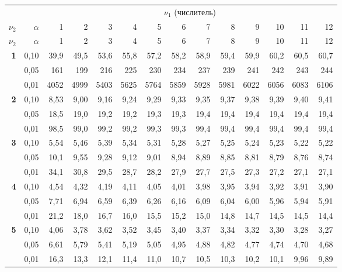 \documentclass[12pt,a4paper]{article}
\begin{document}
{\footnotesize
\setlength{\tabcolsep}{2pt}
\begin{longtable}{@{\extracolsep{\fill}}rrrrrrrrrrrrrr@{}}
\toprule
& & \multicolumn{12}{c}{$\nu_1$ (числитель)} \\
$\nu_2$ & $\alpha$ & 1 & 2 & 3 & 4 & 5 & 6 & 7 & 8 & 9 & 10 & 11 & 12 \\
\midrule
\endfirsthead
\toprule
$\nu_2$ & $\alpha$ & 1 & 2 & 3 & 4 & 5 & 6 & 7 & 8 & 9 & 10 & 11 & 12 \\
\midrule
\endhead
\bottomrule
\endfoot
\textbf{1} & 0,10 & 39,9 & 49,5 & 53,6 & 55,8 & 57,2 & 58,2 & 58,9 & 59,4 & 59,9 & 60,2 & 60,5 & 60,7 \\*
 & 0,05 & 161 & 199 & 216 & 225 & 230 & 234 & 237 & 239 & 241 & 242 & 243 & 244 \\*
 & 0,01 & 4052 & 4999 & 5403 & 5625 & 5764 & 5859 & 5928 & 5981 & 6022 & 6056 & 6083 & 6106 \\
\addlinespace[1pt]
\textbf{2} & 0,10 & 8,53 & 9,00 & 9,16 & 9,24 & 9,29 & 9,33 & 9,35 & 9,37 & 9,38 & 9,39 & 9,40 & 9,41 \\*
 & 0,05 & 18,5 & 19,0 & 19,2 & 19,2 & 19,3 & 19,3 & 19,4 & 19,4 & 19,4 & 19,4 & 19,4 & 19,4 \\*
 & 0,01 & 98,5 & 99,0 & 99,2 & 99,2 & 99,3 & 99,3 & 99,4 & 99,4 & 99,4 & 99,4 & 99,4 & 99,4 \\
\addlinespace[1pt]
\textbf{3} & 0,10 & 5,54 & 5,46 & 5,39 & 5,34 & 5,31 & 5,28 & 5,27 & 5,25 & 5,24 & 5,23 & 5,22 & 5,22 \\*
 & 0,05 & 10,1 & 9,55 & 9,28 & 9,12 & 9,01 & 8,94 & 8,89 & 8,85 & 8,81 & 8,79 & 8,76 & 8,74 \\*
 & 0,01 & 34,1 & 30,8 & 29,5 & 28,7 & 28,2 & 27,9 & 27,7 & 27,5 & 27,3 & 27,2 & 27,1 & 27,1 \\
\addlinespace[1pt]
\textbf{4} & 0,10 & 4,54 & 4,32 & 4,19 & 4,11 & 4,05 & 4,01 & 3,98 & 3,95 & 3,94 & 3,92 & 3,91 & 3,90 \\*
 & 0,05 & 7,71 & 6,94 & 6,59 & 6,39 & 6,26 & 6,16 & 6,09 & 6,04 & 6,00 & 5,96 & 5,94 & 5,91 \\*
 & 0,01 & 21,2 & 18,0 & 16,7 & 16,0 & 15,5 & 15,2 & 15,0 & 14,8 & 14,7 & 14,5 & 14,5 & 14,4 \\
\addlinespace[1pt]
\textbf{5} & 0,10 & 4,06 & 3,78 & 3,62 & 3,52 & 3,45 & 3,40 & 3,37 & 3,34 & 3,32 & 3,30 & 3,28 & 3,27 \\*
 & 0,05 & 6,61 & 5,79 & 5,41 & 5,19 & 5,05 & 4,95 & 4,88 & 4,82 & 4,77 & 4,74 & 4,70 & 4,68 \\*
 & 0,01 & 16,3 & 13,3 & 12,1 & 11,4 & 11,0 & 10,7 & 10,5 & 10,3 & 10,2 & 10,1 & 9,96 & 9,89 \\

\end{longtable}}
\end{document}
